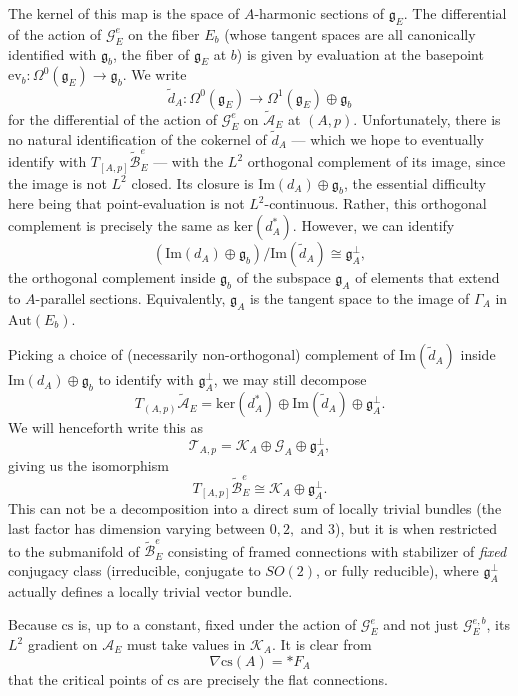 \documentclass{memo-l}
\theoremstyle{definition}
\theoremstyle{remark}
\numberwithin{section}{chapter}
\numberwithin{equation}{chapter}
\begin{document}
The kernel of this map is the space of $A$-harmonic sections of $\mathfrak g_E$. The differential of the action of $\mathcal G^e_E$ on the fiber $E_b$ (whose tangent spaces are all canonically identified with $\mathfrak g_b$, the fiber of $\mathfrak g_E$ at $b$) is given by evaluation at the basepoint $\text{ev}_b: \Omega^0(\mathfrak g_E) \to \mathfrak g_b$. We write 
$$\tilde d_A: \Omega^0(\mathfrak g_E) \to \Omega^1(\mathfrak g_E) \oplus \mathfrak g_b$$ 
for the differential of the action of $\mathcal G^e_E$ on $\widetilde{\mathcal A}_E$ at $(A,p)$. Unfortunately, there is no natural identification of the cokernel of $\tilde d_A$ --- which we hope to eventually identify with $T_{[A,p]} \widetilde{\mathcal B}^e_E$ --- with the $L^2$ orthogonal complement of its image, since the image is not $L^2$ closed. Its closure is $\text{Im}(d_A) \oplus \mathfrak g_b$, the essential difficulty here being that point-evaluation is not $L^2$-continuous. Rather, this orthogonal complement is precisely the same as $\text{ker}(d_A^*)$. However, we can identify $$(\text{Im}(d_A) \oplus \mathfrak g_b)/\text{Im}(\tilde d_A) \cong \mathfrak g_A^\perp,$$ the orthogonal complement inside $\mathfrak g_b$ of the subspace $\mathfrak g_A$ of elements that extend to $A$-parallel sections. Equivalently, $\mathfrak g_A$ is the tangent space to the image of $\Gamma_A$ in $\text{Aut}(E_b)$. 

Picking a choice of (necessarily non-orthogonal) complement of $\text{Im}(\tilde d_A)$ inside $\text{Im}(d_A) \oplus \mathfrak g_b$ to identify with $\mathfrak g_A^\perp$, we may still decompose 
$$T_{(A,p)} \widetilde{\mathcal A}_E = \text{ker}(d_A^*) \oplus \text{Im}(\tilde d_A) \oplus \mathfrak g_A^\perp.$$ 
We will henceforth write this as 
$$\mathcal T_{A,p} = \mathcal K_A \oplus \mathcal G_A \oplus \mathfrak g_A^\perp,$$ 
giving us the isomorphism 
$$T_{[A,p]}\widetilde{\mathcal B}^e_E \cong \mathcal K_A \oplus \mathfrak g_A^\perp.$$ 
This can not be a decomposition into a direct sum of locally trivial bundles (the last factor has dimension varying between $0, 2,$ and $3$), but it is when restricted to the submanifold of $\widetilde{\mathcal B}^e_E$ consisting of framed connections with stabilizer of \emph{fixed} conjugacy class (irreducible, conjugate to $SO(2)$, or fully reducible), where $\mathfrak g_A^\perp$ actually defines a locally trivial vector bundle.

Because $\text{cs}$ is, up to a constant, fixed under the action of $\mathcal G^e_E$ and not just $\mathcal G^{e,b}_E$, its $L^2$ gradient on $\mathcal A_E$ must take values in $\mathcal K_A$. It is clear from $$\nabla \text{cs}(A) = *F_A$$ that the critical points of $\text{cs}$ are precisely the flat connections.
\end{document}
